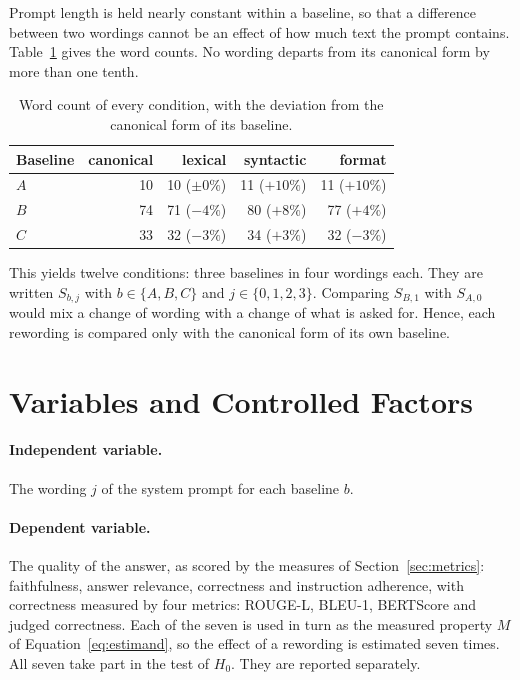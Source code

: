 \documentclass[12pt,a4paper,oneside]{scrreprt}
\begin{document}
Prompt length is held nearly constant within a baseline, so that a difference between two wordings cannot be an effect of how much text the prompt contains. Table~\ref{tab:lengths} gives the word counts. No wording departs from its canonical form by more than one tenth.
\begin{table}[htbp]
\centering
\caption{Word count of every condition, with the deviation from the canonical form of its baseline.}
\label{tab:lengths}
\begin{tabular}{lrrrr}
\toprule
Baseline & canonical & lexical & syntactic & format \\
\midrule
$A$ & 10 & 10 ($\pm 0\%$) & 11 ($+10\%$) & 11 ($+10\%$) \\
$B$ & 74 & 71 ($-4\%$) & 80 ($+8\%$) & 77 ($+4\%$) \\
$C$ & 33 & 32 ($-3\%$) & 34 ($+3\%$) & 32 ($-3\%$) \\
\bottomrule
\end{tabular}
\end{table}

This yields twelve conditions: three baselines in four wordings each. They are written $S_{b,j}$ with $b \in \{A,B,C\}$ and $j \in \{0,1,2,3\}$. Comparing $S_{B,1}$ with $S_{A,0}$ would mix a change of wording with a change of what is asked for. Hence, each rewording is compared only with the canonical form of its own baseline.

\section{Variables and Controlled Factors}
\label{sec:variables}

\paragraph{Independent variable.} The wording $j$ of the system prompt for each baseline $b$. 

\paragraph{Dependent variable.} The quality of the answer, as scored by the measures of Section~\ref{sec:metrics}: faithfulness, answer relevance, correctness and instruction adherence, with correctness measured by four metrics: ROUGE-L, BLEU-1, BERTScore and judged correctness. Each of the seven is used in turn as the measured property $M$ of Equation~\eqref{eq:estimand}, so the effect of a rewording is estimated seven times. All seven take part in the test of $H_0$. They are reported separately.
\end{document}
